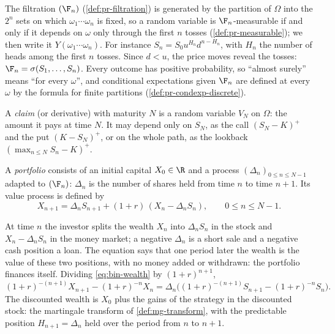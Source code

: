 The filtration $(\F_n)$ (\cref{def:pr-filtration}) is generated by the partition of
$\Omega$ into the $2^n$ sets on which $\omega_1\cdots\omega_n$ is fixed, so a random
variable is $\F_n$-measurable if and only if it depends on $\omega$ only through the first
$n$ tosses (\cref{def:pr-measurable}); we then write it $Y(\omega_1\cdots\omega_n)$. For
instance $S_n=S_0u^{H_n}d^{n-H_n}$, with $H_n$ the number of heads among the first $n$
tosses. Since $d<u$, the price moves reveal the tosses: $\F_n=\sigma(S_1,\dots,S_n)$.
Every outcome has positive probability, so ``almost surely'' means ``for every $\omega$'',
and conditional expectations given $\F_n$ are defined at every $\omega$ by the formula for
finite partitions (\cref{def:pr-condexp-discrete}).

A \emph{claim} (or derivative) with maturity $N$ is a random variable $V_N$ on $\Omega$:
the amount it pays at time $N$. It may depend only on $S_N$, as the call $(S_N-K)^+$ and
the put $(K-S_N)^+$, or on the whole path, as the lookback $(\max_{n\le N}S_n-K)^+$.

\begin{definition}\label{def:bin-portfolio}
A \emph{portfolio} consists of an initial capital $X_0\in\R$ and a process
$(\Delta_n)_{0\le n\le N-1}$ adapted to $(\F_n)$: $\Delta_n$ is the number of shares held
from time $n$ to time $n+1$. Its value process is defined by
\begin{equation}\label{eq:bin-wealth}
  X_{n+1}=\Delta_nS_{n+1}+(1+r)\,(X_n-\Delta_nS_n),\qquad 0\le n\le N-1 .
\end{equation}
\end{definition}

At time $n$ the investor splits the wealth $X_n$ into $\Delta_nS_n$ in the stock and
$X_n-\Delta_nS_n$ in the money market; a negative $\Delta_n$ is a short sale and a negative
cash position a loan. The equation says that one period later the wealth is the value of
these two positions, with no money added or withdrawn: the portfolio finances itself.
Dividing \eqref{eq:bin-wealth} by $(1+r)^{n+1}$,
\begin{equation}\label{eq:bin-discounted-wealth}
  (1+r)^{-(n+1)}X_{n+1}-(1+r)^{-n}X_n=\Delta_n\Big((1+r)^{-(n+1)}S_{n+1}-(1+r)^{-n}S_n\Big).
\end{equation}
The discounted wealth is $X_0$ plus the gains of the strategy in the discounted stock: the
martingale transform of \cref{def:mg-transform}, with the predictable position
$H_{n+1}=\Delta_n$ held over the period from $n$ to $n+1$.

